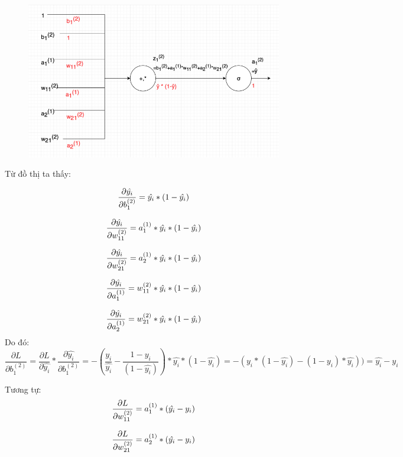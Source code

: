 \FloatBarrier
\begin{figure}[htp]
\begin{center}
\includegraphics[scale=1]{chap2/c2_figs/6.png}
\end{center}
\label{fig:feed_forward}
\end{figure}
\FloatBarrier

Từ đồ thị ta thấy:

$$\frac{\partial\hat{y_i}}{\partial b_1^{(2)}} = \hat{y_i} * (1-\hat{y_i})\newline$$

$$\frac{\partial\hat{y_i}}{\partial w_{11}^{(2)}} = a_1^{(1)}*\hat{y_i} * (1-\hat{y_i})\newline$$

$$\frac{\partial\hat{y_i}}{\partial w_{21}^{(2)}} = a_2^{(1)}*\hat{y_i} * (1-\hat{y_i})\newline$$

$$\frac{\partial\hat{y_i}}{\partial a_1^{(1)} }=w_{11} ^{(2)}*\hat{y_i} * (1-\hat{y_i})\newline$$

$$\frac{\partial\hat{y_i}}{\partial a_2^{(1)} }=w_{21} ^{(2)}*\hat{y_i} * (1-\hat{y_i})\newline$$
Do đó:
$$\frac{\partial L}{\partial b_1^{(2)}} = \frac{\partial L}{\partial\hat{y_i}} * \frac {\partial\hat{y_i}}{\partial b_1^{(2)}} = - (\frac{y_i}{\hat{y_i}} - \frac{1-y_i}{(1-\hat{y_i})}) * \hat{y_i} * (1-\hat{y_i}) = -(y_i * (1-\hat{y_i}) - (1-y_i) * \hat{y_i})) = \hat{y_i}-y_i$$

Tương tự:
$$\frac{\partial L}{\partial w_{11} ^ {(2)}} = a_1 ^ {(1)} *     (\hat{y_i}-y_i)\newline \newline$$

$$\frac{\partial L}{\partial w_{21} ^ {(2)}} = a_2 ^ {(1)} *     (\hat{y_i}-y_i) \newline \newline$$

